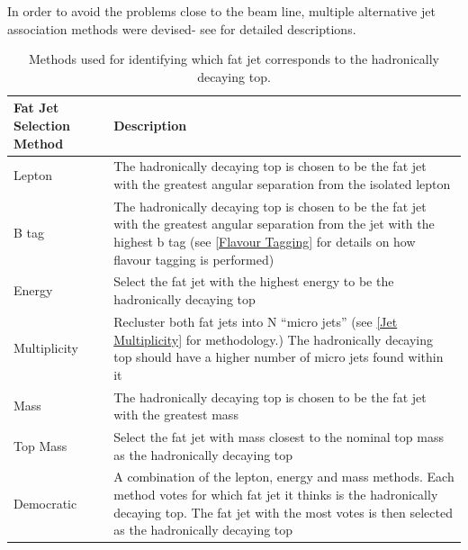 In order to avoid the problems close to the beam line, multiple alternative jet association methods were devised- see  for detailed descriptions.
\begin{table}
  \centering
  \begin{tabular}{l |p{100mm}}
    \toprule
    Fat Jet Selection Method     & Description  \\
    \midrule
    Lepton & The hadronically decaying top is chosen to be the fat jet with the greatest angular separation from the isolated lepton\\
    \midrule
    B tag & The hadronically decaying top is chosen to be the fat jet with the greatest angular separation from the jet with the highest b tag (see \ref{Flavour Tagging} for details on how flavour tagging is performed)\\
    \midrule
    Energy & Select the fat jet with the highest energy to be the hadronically decaying top\\
    \midrule
    Multiplicity & Recluster both fat jets into N ``micro jets'' (see \ref{Jet Multiplicity} for methodology.) The hadronically decaying top should have a higher number of micro jets found within it\\
    \midrule
    Mass & The hadronically decaying top is chosen to be the fat jet with the greatest mass \\
    \midrule
    Top Mass & Select the fat jet with mass closest to the nominal top mass as the hadronically decaying top \\
    \midrule
    Democratic & A combination of the lepton, energy and mass methods. Each method votes for which fat jet it thinks is the hadronically decaying top. The fat jet with the most votes is then selected as the hadronically decaying top  \\
    \bottomrule
  \end{tabular}
  \caption{Methods used for identifying which fat jet corresponds to the hadronically decaying top.}
  \label{tab:methodDescription}
\end{table}

